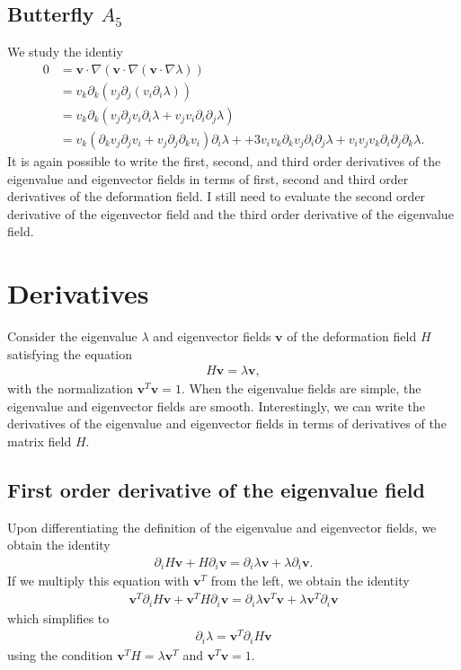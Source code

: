 \documentclass{article}
\begin{document}
\subsection{Butterfly $A_5$}
We study the identiy
\begin{align}
0
&=\bm{v}\cdot \nabla( \bm{v} \cdot \nabla (\bm{v} \cdot \nabla \lambda))\\
&= v_k \partial_k(v_j \partial_j(v_i \partial_i \lambda))\\
&= v_k \partial_k(v_j \partial_j v_i \partial_i \lambda + v_j  v_i \partial_i \partial_j \lambda)\\
&= 
v_k (\partial_k v_j \partial_j v_i + v_j \partial_j\partial_k v_i)\partial_i \lambda + 
+ 3 v_i v_k \partial_k v_j \partial_i \partial_j \lambda
+ v_i v_j v_k \partial_i \partial_j \partial_k \lambda.
\end{align}
It is again possible to write the first, second, and third order derivatives of the eigenvalue and eigenvector fields in terms of first, second and third order derivatives of the deformation field. I still need to evaluate the second order derivative of the eigenvector field and the third order derivative of the eigenvalue field.


\newpage
\section{Derivatives}
Consider the eigenvalue $\lambda$ and eigenvector fields $\bm{v}$ of the deformation field $H$ satisfying the equation
\begin{align}
H \bm{v} = \lambda \bm{v},
\end{align}
with the normalization $\bm{v}^T\bm{v}=1$. When the eigenvalue fields are simple, the eigenvalue and eigenvector fields are smooth. Interestingly, we can write the derivatives of the eigenvalue and eigenvector fields in terms of derivatives of the matrix field $H$.

\subsection{First order derivative of the eigenvalue field}
Upon differentiating the definition of the eigenvalue and eigenvector fields, we obtain the identity 
\begin{align}
\partial_i H \bm{v} + H \partial_i \bm{v} = \partial_i \lambda \bm{v} + \lambda \partial_i \bm{v}.
\end{align}
If we multiply this equation with $\bm{v}^T$ from the left, we obtain the identity
\begin{align}
\bm{v}^T\partial_i H \bm{v} + \bm{v}^TH \partial_i \bm{v} = \partial_i \lambda \bm{v}^T\bm{v} + \lambda \bm{v}^T \partial_i \bm{v}
\end{align}
which simplifies to
\begin{align}
\partial_i \lambda = \bm{v}^T\partial_i H \bm{v} 
\end{align}
using the condition $\bm{v}^T H = \lambda \bm{v}^T$ and $\bm{v}^T\bm{v}=1$.
\end{document}
